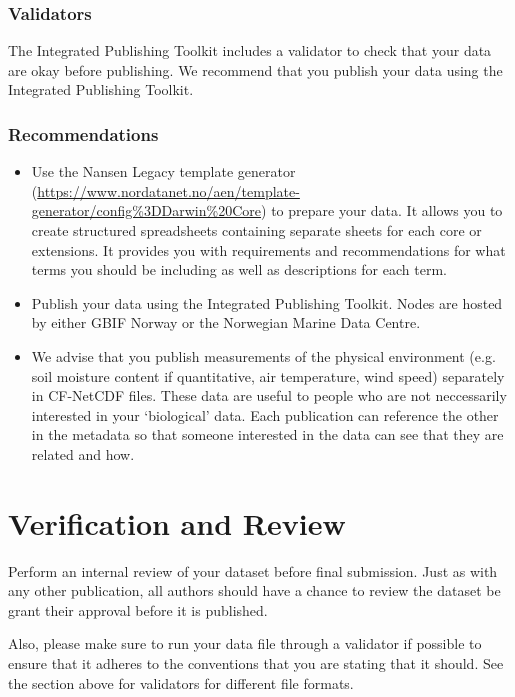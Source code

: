\documentclass[a4paper,12pt]{article}
\begin{document}
\subsubsection{Validators}

The Integrated Publishing Toolkit includes a validator to check that your data are okay before publishing. We recommend that you publish your data using the Integrated Publishing Toolkit.

\subsubsection{Recommendations}

\begin{itemize}
\item Use the Nansen Legacy template generator (\url{https://www.nordatanet.no/aen/template-generator/config%3DDarwin%20Core}) to prepare your data. It allows you to create structured spreadsheets containing separate sheets for each core or extensions. It provides you with requirements and recommendations for what terms you should be including as well as descriptions for each term.
\item Publish your data using the Integrated Publishing Toolkit. Nodes are hosted by either GBIF Norway or the Norwegian Marine Data Centre.
\item We advise that you publish measurements of the physical environment (e.g. soil moisture content if quantitative, air temperature, wind speed) separately in CF-NetCDF files. These data are useful to people who are not neccessarily interested in your `biological' data. Each publication can reference the other in the metadata so that someone interested in the data can see that they are related and how.
\end{itemize}


\section{Verification and Review}
\label{sec:verification-review}

Perform an internal review of your dataset before final submission. Just as with any other publication, all authors should have a chance to review the dataset be grant their approval before it is published.

Also, please make sure to run your data file through a validator if possible to ensure that it adheres to the conventions that you are stating that it should. See the section above for validators for different file formats.
\end{document}
